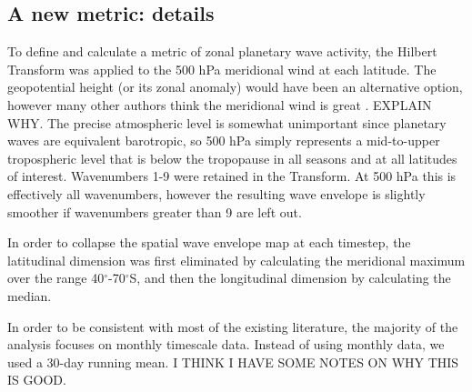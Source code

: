 \subsection{A new metric: details}

To define and calculate a metric of zonal planetary wave activity, the Hilbert Transform was applied to the 500 hPa meridional wind at each latitude. The geopotential height (or its zonal anomaly) would have been an alternative option, however many other authors think the meridional wind is great \citep[e.g.][]{Hope2014}. EXPLAIN WHY. The precise atmospheric level is somewhat unimportant since planetary waves are equivalent barotropic, so 500 hPa simply represents a mid-to-upper tropospheric level that is below the tropopause in all seasons and at all latitudes of interest. Wavenumbers 1-9 were retained in the Transform. At 500 hPa this is effectively all wavenumbers, however the resulting wave envelope is slightly smoother if wavenumbers greater than 9 are left out.

In order to collapse the spatial wave envelope map at each timestep, the latitudinal dimension was first eliminated by calculating the meridional maximum over the range 40$^{\circ}$-70$^{\circ}$S, and then the longitudinal dimension by calculating the median.

In order to be consistent with most of the existing literature, the majority of the analysis focuses on monthly timescale data. Instead of using monthly data, we used a 30-day running mean. I THINK I HAVE SOME NOTES ON WHY THIS IS GOOD.

